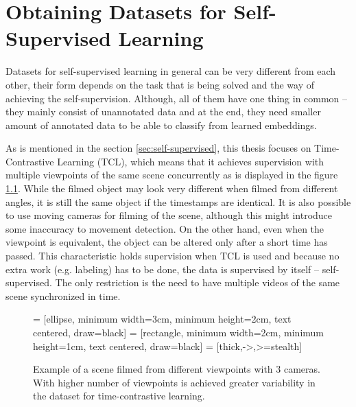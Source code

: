 \chapter{\label{chap:dataset}Obtaining Datasets for Self-Supervised Learning}

Datasets for self-supervised learning in general can be very different from each other, their form depends on the task that is being solved and the way of achieving the self-supervision. Although, all of them have one thing in common -- they mainly consist of unannotated data and at the end, they need smaller amount of annotated data to be able to classify from learned embeddings.

As is mentioned in the section \ref{sec:self-supervised}, this thesis focuses on Time-Contrastive Learning (TCL), which means that it achieves supervision with multiple viewpoints of the same scene concurrently as is displayed in the figure \ref{fig:scene-multiple-cameras}. While the filmed object may look very different when filmed from different angles, it is still the same object if the timestamps are identical. It is also possible to use moving cameras for filming of the scene, although this might introduce some inaccuracy to movement detection. On the other hand, even when the viewpoint is equivalent, the object can be altered only after a short time has passed. This characteristic holds supervision when TCL is used and because no extra work (e.g. labeling) has to be done, the data is supervised by itself -- self-supervised. The only restriction is the need to have multiple videos of the same scene synchronized in time.

\begin{figure}[ht!]
    \centering

     = [ellipse, minimum width=3cm, minimum height=2cm, text centered, draw=black]
     = [rectangle, minimum width=2cm, minimum height=1cm, text centered, draw=black]
     = [thick,->,>=stealth]

    
    \caption{Example of a scene filmed from different viewpoints with 3 cameras. With higher number of viewpoints is achieved greater variability in the dataset for time-contrastive learning.}
    \label{fig:scene-multiple-cameras}
\end{figure}

